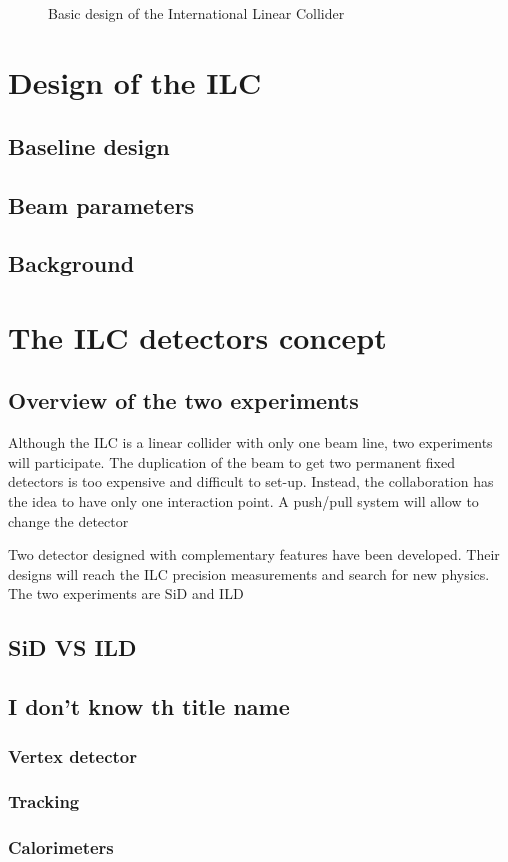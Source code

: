     \subsection{}
  

  \begin{figure}
    \centering
    \caption{Basic design of the International Linear Collider}
    \label{fig:ILC}
  \end{figure}
  \section{Design of the ILC}
    \subsection{Baseline design}
    \subsection{Beam parameters}
    \subsection{Background}

  \section{The ILC detectors concept}

    \subsection{Overview of the two experiments}
    
  Although the ILC is a linear collider with only one beam line, two experiments will participate.
  The duplication of the beam to get two permanent fixed detectors is too expensive and difficult to set-up.
  Instead, the collaboration has the idea to have only one interaction point.
  A push/pull system will allow to change the detector 

  Two detector designed with complementary features have been developed. 
  Their designs will reach the ILC precision measurements and search for new physics. 
  The two experiments are SiD and ILD


      \subsection{SiD VS ILD}

    \subsection{I don't know th title name}
      \subsubsection{Vertex detector}
      \subsubsection{Tracking}
      \subsubsection{Calorimeters}
